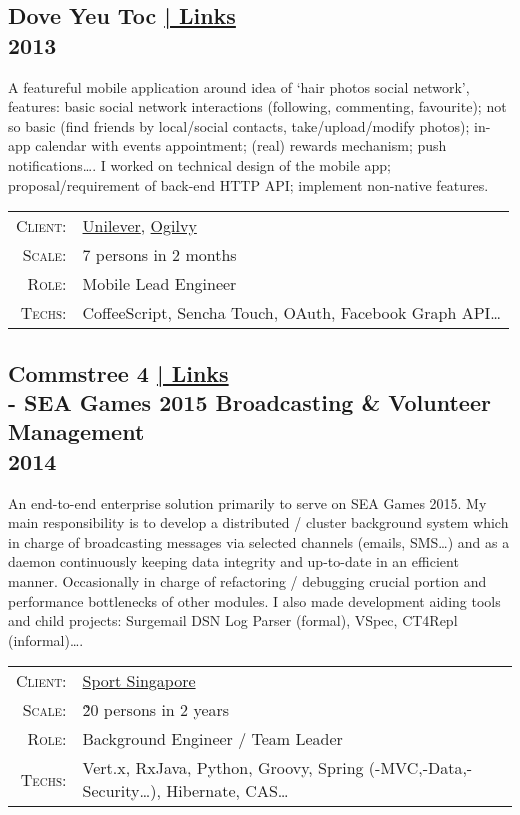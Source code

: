 \documentclass[a4paper,10pt]{article}
\begin{document}
\subsection*{Dove Yeu Toc \hfill \footnotesize {\hyperlink{dove-links}{| Links}}\\\small 2013}
A featureful mobile application around idea of `hair photos social network', features: basic social network interactions (following, commenting, favourite); not so basic (find friends by local/social contacts, take/upload/modify photos); in-app calendar with events appointment; (real) rewards mechanism; push notifications\ldots. I worked on technical design of the mobile app; proposal/requirement of back-end HTTP API; implement non-native features.

\begin{tabular}{rl}
    \textsc{Client:} & \href{http://www.unilever.com/}{Unilever}, \href{http://www.ogilvy.com/}{Ogilvy}\\
    \textsc{Scale:} & 7 persons in 2 months\\
    \textsc{Role}: & Mobile Lead Engineer\\
    \textsc{Techs:} & CoffeeScript, Sencha Touch, OAuth, Facebook Graph API\ldots\\
\end{tabular}

\subsection*{Commstree 4 \hfill \footnotesize {\hyperlink{ct-links}{| Links}}\\\large - SEA Games 2015 Broadcasting \& Volunteer Management\\\small 2014}
An end-to-end enterprise solution primarily to serve on SEA Games 2015. My main responsibility is to develop a distributed / cluster background system which in charge of broadcasting messages via selected channels (emails, SMS\ldots) and as a daemon continuously keeping data integrity and up-to-date in an efficient manner. Occasionally in charge of refactoring / debugging crucial portion and performance bottlenecks of other modules. I also made development aiding tools and child projects: Surgemail DSN Log Parser (formal), VSpec, CT4Repl (informal)\ldots.


\begin{tabular}{rl}
    \textsc{Client:} & \href{http://www.sportsingapore.gov.sg/}{Sport Singapore}\\
    \textsc{Scale:} & \~20 persons in 2 years\\
    \textsc{Role:} & Background Engineer / Team Leader\\ 
    \textsc{Techs:} & Vert.x, RxJava, Python, Groovy, Spring (-MVC,-Data,-Security\ldots), Hibernate, CAS\ldots\\
\end{tabular}
    
\end{document}
